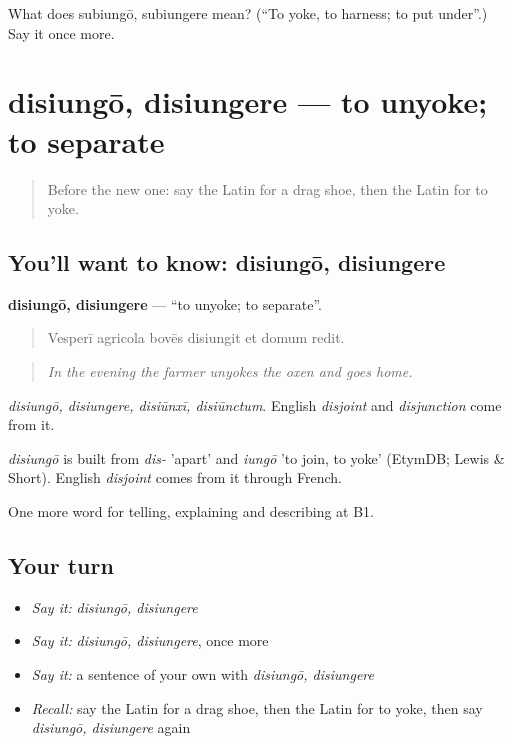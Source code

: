 \begin{tcolorbox}[breakable,colback=teal!4,colframe=teal!35!black,title={Before you move on}]
What does subiungō, subiungere mean? (\textquotedblleft{}To yoke, to harness; to put under\textquotedblright{}.) Say it once more.
\end{tcolorbox}
\section[disiungō, disiungere]{disiungō, disiungere — to unyoke; to separate}

\label{lesson:LA-C430-disiungo}



\begin{quote}
Before the new one: say the Latin for a drag shoe, then the Latin for to yoke.
\end{quote}

\subsection*{You'll want to know: disiungō, disiungere}
\textbf{disiungō, disiungere} — \textquotedblleft{}to unyoke; to separate\textquotedblright{}.

\begin{quote}
Vesperī agricola bovēs disiungit et domum redit.
\end{quote}

\begin{quote}
\emph{In the evening the farmer unyokes the oxen and goes home.}
\end{quote}

\emph{disiungō, disiungere, disiūnxī, disiūnctum}. English \emph{disjoint} and \emph{disjunction} come from it.

\begin{cousinweb}
\emph{disiungō} is built from \emph{dis-} 'apart' and \emph{iungō} 'to join, to yoke' (EtymDB; Lewis \& Short). English \emph{disjoint} comes from it through French.
\end{cousinweb}

\begin{grammarlens}[title={What you've built}]
One more word for telling, explaining and describing at B1.
\end{grammarlens}

\subsection*{Your turn}
\begin{itemize}
\raggedright
  \item \emph{Say it:} \emph{disiungō, disiungere}
  \item \emph{Say it:} \emph{disiungō, disiungere}, once more
  \item \emph{Say it:} a sentence of your own with \emph{disiungō, disiungere}
  \item \emph{Recall:} say the Latin for a drag shoe, then the Latin for to yoke, then say \emph{disiungō, disiungere} again
\end{itemize}


